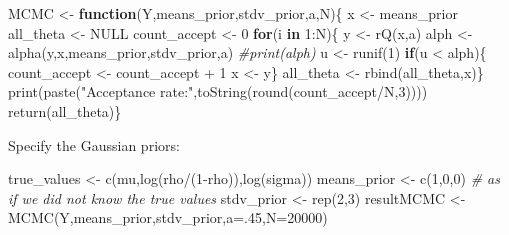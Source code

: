 \documentclass[
  12pt,
]{book}
\newenvironment{Shaded}{\begin{snugshade}}{\end{snugshade}}
\newcommand{\AttributeTok}[1]{\textcolor[rgb]{0.77,0.63,0.00}{#1}}
\newcommand{\CommentTok}[1]{\textcolor[rgb]{0.56,0.35,0.01}{\textit{#1}}}
\newcommand{\ConstantTok}[1]{\textcolor[rgb]{0.00,0.00,0.00}{#1}}
\newcommand{\ControlFlowTok}[1]{\textcolor[rgb]{0.13,0.29,0.53}{\textbf{#1}}}
\newcommand{\DecValTok}[1]{\textcolor[rgb]{0.00,0.00,0.81}{#1}}
\newcommand{\FunctionTok}[1]{\textcolor[rgb]{0.00,0.00,0.00}{#1}}
\newcommand{\NormalTok}[1]{#1}
\newcommand{\OtherTok}[1]{\textcolor[rgb]{0.56,0.35,0.01}{#1}}
\newcommand{\SpecialCharTok}[1]{\textcolor[rgb]{0.00,0.00,0.00}{#1}}
\newcommand{\StringTok}[1]{\textcolor[rgb]{0.31,0.60,0.02}{#1}}
\theoremstyle{definition}
\theoremstyle{definition}
\theoremstyle{definition}
\theoremstyle{definition}
\theoremstyle{remark}
\begin{document}
\begin{Shaded}
\begin{Highlighting}[]
\NormalTok{MCMC }\OtherTok{\textless{}{-}} \ControlFlowTok{function}\NormalTok{(Y,means\_prior,stdv\_prior,a,N)\{}
\NormalTok{  x }\OtherTok{\textless{}{-}}\NormalTok{ means\_prior}
\NormalTok{  all\_theta }\OtherTok{\textless{}{-}} \ConstantTok{NULL}
\NormalTok{  count\_accept }\OtherTok{\textless{}{-}} \DecValTok{0}
  \ControlFlowTok{for}\NormalTok{(i }\ControlFlowTok{in} \DecValTok{1}\SpecialCharTok{:}\NormalTok{N)\{}
\NormalTok{    y }\OtherTok{\textless{}{-}} \FunctionTok{rQ}\NormalTok{(x,a)}
\NormalTok{    alph }\OtherTok{\textless{}{-}} \FunctionTok{alpha}\NormalTok{(y,x,means\_prior,stdv\_prior,a)}
    \CommentTok{\#print(alph)}
\NormalTok{    u }\OtherTok{\textless{}{-}} \FunctionTok{runif}\NormalTok{(}\DecValTok{1}\NormalTok{)}
    \ControlFlowTok{if}\NormalTok{(u }\SpecialCharTok{\textless{}}\NormalTok{ alph)\{}
\NormalTok{      count\_accept }\OtherTok{\textless{}{-}}\NormalTok{ count\_accept }\SpecialCharTok{+} \DecValTok{1}
\NormalTok{      x }\OtherTok{\textless{}{-}}\NormalTok{ y\}}
\NormalTok{    all\_theta }\OtherTok{\textless{}{-}} \FunctionTok{rbind}\NormalTok{(all\_theta,x)\}}
  \FunctionTok{print}\NormalTok{(}\FunctionTok{paste}\NormalTok{(}\StringTok{"Acceptance rate:"}\NormalTok{,}\FunctionTok{toString}\NormalTok{(}\FunctionTok{round}\NormalTok{(count\_accept}\SpecialCharTok{/}\NormalTok{N,}\DecValTok{3}\NormalTok{))))}
  \FunctionTok{return}\NormalTok{(all\_theta)\}}
\end{Highlighting}
\end{Shaded}

Specify the Gaussian priors:

\begin{Shaded}
\begin{Highlighting}[]
\NormalTok{true\_values }\OtherTok{\textless{}{-}} \FunctionTok{c}\NormalTok{(mu,}\FunctionTok{log}\NormalTok{(rho}\SpecialCharTok{/}\NormalTok{(}\DecValTok{1}\SpecialCharTok{{-}}\NormalTok{rho)),}\FunctionTok{log}\NormalTok{(sigma))}
\NormalTok{means\_prior }\OtherTok{\textless{}{-}} \FunctionTok{c}\NormalTok{(}\DecValTok{1}\NormalTok{,}\DecValTok{0}\NormalTok{,}\DecValTok{0}\NormalTok{) }\CommentTok{\# as if we did not know the true values}
\NormalTok{stdv\_prior }\OtherTok{\textless{}{-}} \FunctionTok{rep}\NormalTok{(}\DecValTok{2}\NormalTok{,}\DecValTok{3}\NormalTok{)}
\NormalTok{resultMCMC }\OtherTok{\textless{}{-}} \FunctionTok{MCMC}\NormalTok{(Y,means\_prior,stdv\_prior,}\AttributeTok{a=}\NormalTok{.}\DecValTok{45}\NormalTok{,}\AttributeTok{N=}\DecValTok{20000}\NormalTok{)}
\end{Highlighting}
\end{Shaded}
\end{document}

